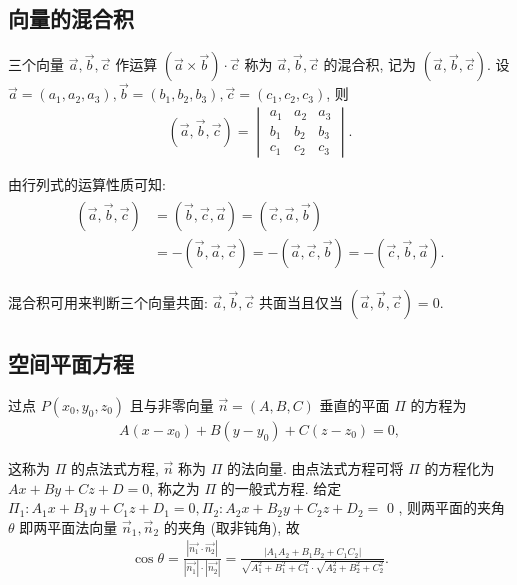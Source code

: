 \subsection{向量的混合积}
三个向量 $\vec{a} , \vec{b} , \vec{c}$ 作运算 $(\vec{a} \times \vec{b}) \cdot \vec{c}$ 称为 $\vec{a} , \vec{b} , \vec{c}$ 的混合积, 记为 $(\vec{a}, \vec{b}, \vec{c})$.
设 $\vec{a}=\left(a_1, a_2, a_3\right), \vec{b}=\left(b_1, b_2, b_3\right), \vec{c}=\left(c_1, c_2, c_3\right)$, 则
\begin{align*}
	(\vec{a}, \vec{b}, \vec{c})=\begin{vmatrix}
		                            a_1 & a_2 & a_3 \\
		                            b_1 & b_2 & b_3 \\
		                            c_1 & c_2 & c_3
	                            \end{vmatrix} .
\end{align*}

由行列式的运算性质可知:
\begin{align*}
	\begin{aligned}
		{(\vec{a}, \vec{b}, \vec{c}) } & =(\vec{b}, \vec{c}, \vec{a})=(\vec{c}, \vec{a}, \vec{b})                                  \\
		                               & =-(\vec{b}, \vec{a}, \vec{c})=-(\vec{a}, \vec{c}, \vec{b})=-(\vec{c}, \vec{b}, \vec{a}) .
	\end{aligned}
\end{align*}

混合积可用来判断三个向量共面: $\vec{a}, \vec{b}, \vec{c}$ 共面当且仅当 $(\vec{a}, \vec{b}, \vec{c})=0$.

\subsection{空间平面方程}
过点 $P\left(x_0, y_0, z_0\right)$ 且与非零向量 $\vec{n}=(A, B, C)$ 垂直的平面 $\Pi$ 的方程为
\begin{align*}
	A\left(x-x_0\right)+B\left(y-y_0\right)+C\left(z-z_0\right)=0,
\end{align*}

这称为 $\Pi$ 的点法式方程, $\vec{n}$ 称为 $\Pi$ 的法向量.
由点法式方程可将 $\Pi$ 的方程化为 $A x+B y+C z+D=0$, 称之为 $\Pi$ 的一般式方程. 给定 $\Pi_1: A_1 x+B_1 y+C_1 z+D_1=0, \Pi_2: A_2 x+B_2 y+C_2 z+D_2=$ 0 , 则两平面的夹角 $\theta$ 即两平面法向量 $\vec{n}_1, \vec{n}_2$ 的夹角 (取非钝角), 故
\begin{align*}
	\cos \theta=\frac{\left|\overrightarrow{n_1} \cdot \overrightarrow{n_2}\right|}{\left|\overrightarrow{n_1}\right| \cdot\left|\overrightarrow{n_2}\right|}=\frac{\left|A_1 A_2+B_1 B_2+C_1 C_2\right|}{\sqrt{A_1^2+B_1^2+C_1^2} \cdot \sqrt{A_2^2+B_2^2+C_2^2}} .
\end{align*}

